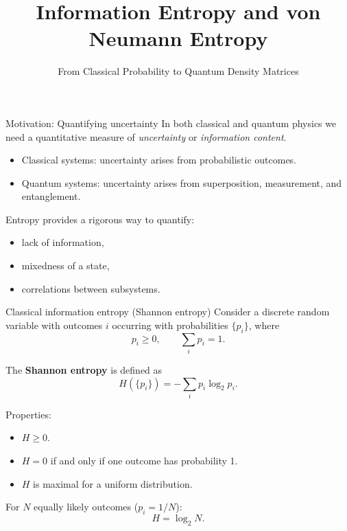 \documentclass[aspectratio=169]{beamer}
\title{Information Entropy and von Neumann Entropy}
\subtitle{From Classical Probability to Quantum Density Matrices}
\author{}
\institute{}
\date{}
\begin{document}
\begin{frame}
  \titlepage
\end{frame}

\begin{frame}{Motivation: Quantifying uncertainty}
In both classical and quantum physics we need a quantitative measure of
\emph{uncertainty} or \emph{information content}.

\medskip
\begin{itemize}
\item Classical systems: uncertainty arises from probabilistic outcomes.
\item Quantum systems: uncertainty arises from superposition, measurement,
      and entanglement.
\end{itemize}

\medskip
Entropy provides a rigorous way to quantify:
\begin{itemize}
\item lack of information,
\item mixedness of a state,
\item correlations between subsystems.
\end{itemize}
\end{frame}

\begin{frame}{Classical information entropy (Shannon entropy)}
Consider a discrete random variable with outcomes $i$ occurring with
probabilities $\{p_i\}$, where
\[
p_i \ge 0, \qquad \sum_i p_i = 1.
\]

\medskip
The \textbf{Shannon entropy} is defined as
\[
H(\{p_i\}) = -\sum_i p_i \log_2 p_i.
\]

\medskip
Properties:
\begin{itemize}
\item $H \ge 0$.
\item $H=0$ if and only if one outcome has probability 1.
\item $H$ is maximal for a uniform distribution.
\end{itemize}

\medskip
For $N$ equally likely outcomes ($p_i=1/N$):
\[
H = \log_2 N.
\]
\end{frame}
\end{document}
